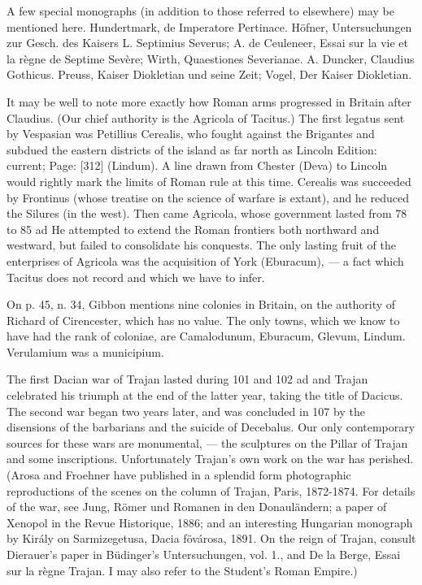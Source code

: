 A few special monographs (in addition to those referred to elsewhere) may be mentioned here. Hundertmark, de Imperatore Pertinace. Höfner, Untersuchungen zur Gesch. des Kaisers L. Septimius Severus; A. de Ceuleneer, Essai sur la vie et la règne de Septime Sevère; Wirth, Quaestiones Severianae. A. Duncker, Claudius Gothicus. Preuss, Kaiser Diokletian und seine Zeit; Vogel, Der Kaiser Diokletian.


It may be well to note more exactly how Roman arms progressed in Britain after Claudius. (Our chief authority is the Agricola of Tacitus.) The first legatus sent by Vespasian was Petillius Cerealis, who fought against the Brigantes and subdued the eastern districts of the island as far north as Lincoln Edition: current; Page: [312] (Lindum). A line drawn from Chester (Deva) to Lincoln would rightly mark the limits of Roman rule at this time. Cerealis was succeeded by Frontinus (whose treatise on the science of warfare is extant), and he reduced the Silures (in the west). Then came Agricola, whose government lasted from 78 to 85 ad He attempted to extend the Roman frontiers both northward and westward, but failed to consolidate his conquests. The only lasting fruit of the enterprises of Agricola was the acquisition of York (Eburacum), \texthebrew{—} a fact which Tacitus does not record and which we have to infer.

On p. 45, n. 34, Gibbon mentions nine colonies in Britain, on the authority of Richard of Cirencester, which has no value. The only towns, which we know to have had the rank of coloniae, are Camalodunum, Eburacum, Glevum, Lindum. Verulamium was a municipium.


The first Dacian war of Trajan lasted during 101 and 102 ad and Trajan celebrated his triumph at the end of the latter year, taking the title of Dacicus. The second war began two years later, and was concluded in 107 by the disensions of the barbarians and the suicide of Decebalus. Our only contemporary sources for these wars are monumental, \texthebrew{—} the sculptures on the Pillar of Trajan and some inscriptions. Unfortunately Trajan\texthebrew{}’s own work on the war has perished. (Arosa and Froehner have published in a splendid form photographic reproductions of the scenes on the column of Trajan, Paris, 1872-1874. For details of the war, see Jung, Römer und Romanen in den Donauländern; a paper of Xenopol in the Revue Historique, 1886; and an interesting Hungarian monograph by Király on Sarmizegetusa, Dacia fövárosa, 1891. On the reign of Trajan, consult Dierauer\texthebrew{}’s paper in Büdinger\texthebrew{}’s Untersuchungen, vol. 1., and De la Berge, Essai sur la règne Trajan. I may also refer to the Student\texthebrew{}’s Roman Empire.)

